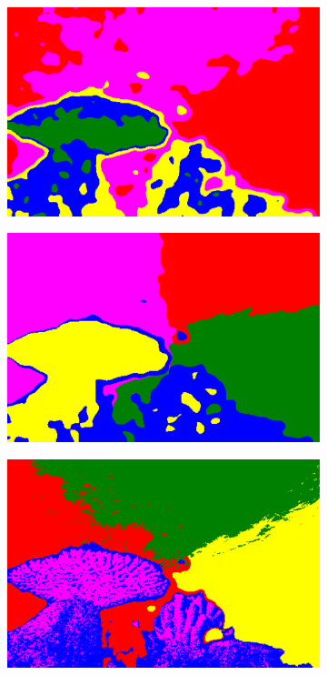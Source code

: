 \begin{figure}[h!]
\begin{subfigure}[t]{0.32\textwidth}
		\includegraphics[width=\textwidth,keepaspectratio]{images/gen/GEN_tsugf_filterbank_101027_blur.png}
	\end{subfigure}
	\hfill
	\begin{subfigure}[t]{0.32\textwidth}
		\centering
		\includegraphics[width=\textwidth,keepaspectratio]{images/gen/GEN_tsugf_filterbank_101027_blur_norm_spatial.png}
	\end{subfigure}
	\hfill
	\begin{subfigure}[t]{0.32\textwidth}
		\centering
		\includegraphics[width=\textwidth,keepaspectratio]{images/gen/GEN_tsugf_filterbank_101027_blur_norm_spatial_color.png}

\end{subfigure}
\end{figure}
